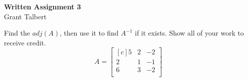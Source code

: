 \documentclass{article}
\begin{document}
\large

\thispagestyle{fancy}
\pagestyle{fancy}
\begin{center}
\textbf{Written Assignment 3}\\
Grant Talbert
\end{center}
 Find the $adj(A)$, then use it to find $A^{-1}$ if it exists.  Show all of your work to receive credit. 
\[ A =
 \begin{bmatrix}[c]
5 & 2 & -2   \\
2 & 1 &- 1 \\
6 & 3 & -2\\
\end{bmatrix} \]\\
\noindent\makebox[\linewidth]{\rule{\linewidth}{0.4pt}}\\
\end{document}

